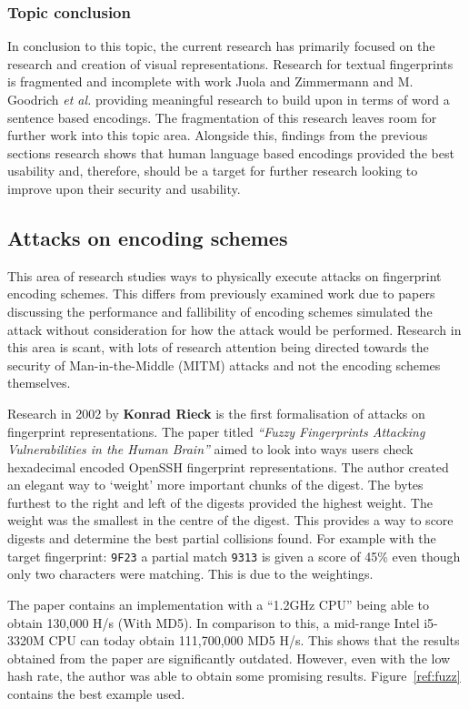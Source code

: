 \subsubsection{Topic conclusion}

In conclusion to this topic, the current research has primarily focused on the research and creation of visual representations. Research for textual fingerprints is fragmented and incomplete with work Juola and Zimmermann 
\cite{juola1996whole} and M. Goodrich \textit{et al.}\cite{goodrich2006loud} providing meaningful research to build upon in terms of word a sentence based encodings. The fragmentation of this research leaves room for further work into this topic area. Alongside this, findings from the previous sections research shows that human language based encodings provided the best usability and, therefore, should be a target for further research looking to improve upon their security and usability.

\subsection{Attacks on encoding schemes}
This area of research studies ways to physically execute attacks on fingerprint encoding schemes. This differs from previously examined work due to papers discussing the performance and fallibility of encoding schemes simulated the attack without consideration for how the attack would be performed. Research in this area is scant, with lots of research attention being directed towards the security of Man-in-the-Middle (MITM) attacks and not the encoding schemes themselves.

Research in 2002 by \textbf{Konrad Rieck}\cite{rieck2002fuzzy} is the first formalisation of attacks on fingerprint representations. The paper titled \textit{``Fuzzy Fingerprints Attacking Vulnerabilities in the Human Brain''}
aimed to look into ways users check hexadecimal encoded OpenSSH fingerprint representations. The author created an elegant way to `weight' more important chunks of the digest. The bytes furthest to the right and left of the digests provided the highest weight. The weight was the smallest in the centre of the digest. This provides a way to score digests and determine the best partial collisions found. For example with the target fingerprint: \verb|9F23| a partial match \verb|9313| is given a score of 45\% even though only two characters were matching. This is due to the weightings.

The paper contains an implementation with a ``1.2GHz CPU'' being able to obtain 130,000 H/s (With MD5). In comparison to this, a mid-range Intel i5-3320M CPU can today obtain 111,700,000 MD5 H/s. This shows that the results obtained from the paper are significantly outdated. However, even with the low hash rate, the author was able to obtain some promising results. Figure~\ref{ref:fuzz} contains the best example used.

